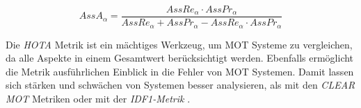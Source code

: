 \begin{equation}
    \label{eq:AssAfromPrRe}
    AssA_{\alpha} = \frac{AssRe_{\alpha} \cdot AssPr_{\alpha} }{AssRe_{\alpha} + AssPr_{\alpha} - AssRe_{\alpha} \cdot AssPr_{\alpha}}
\end{equation}

Die \textit{\gls{HOTA}} Metrik ist ein mächtiges Werkzeug, um \gls{MOT} Systeme zu vergleichen, da alle Aspekte in einem Gesamtwert berücksichtigt werden. Ebenfalls ermöglicht die Metrik ausführlichen Einblick in die Fehler von \gls{MOT} Systemen. Damit lassen sich stärken und schwächen von Systemen besser analysieren, als mit den \textit{\acrshort{CLEAR} \gls{MOT}} Metriken oder mit der \textit{\gls{IDF1}-Metrik} \cite{HOTA}. 